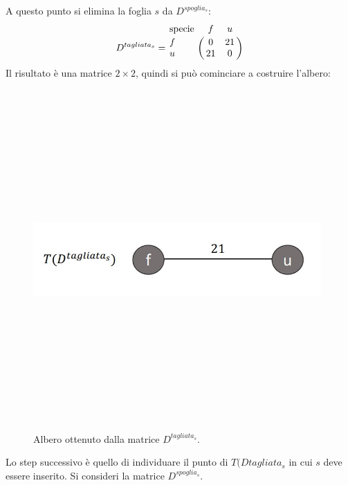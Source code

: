 A questo punto si elimina la foglia $s$ da $D^{spoglia_{s}}$:
\[
D^{tagliata_{s}}= \bordermatrix{\text{specie}&f&u\cr
                f& 0 & 21\cr
                u& 21 & 0}
\]
Il risultato è una matrice $2 \times 2$, quindi si può cominciare a costruire l'albero:
\begin{figure}[h!]
\centering
	\includegraphics[height=13cm, width=11cm, keepaspectratio]{additive_tree_2.jpg}
 	\caption{Albero ottenuto dalla matrice $D^{tagliata_{s}}$.}
  	\label{fig:additivePhylogeny_1}
\end{figure}
\newline
Lo step successivo è quello di individuare il punto di $T(D{tagliata_{s}}$ in cui $s$ deve essere inserito. Si consideri la matrice $D^{spoglia_{s}}$.